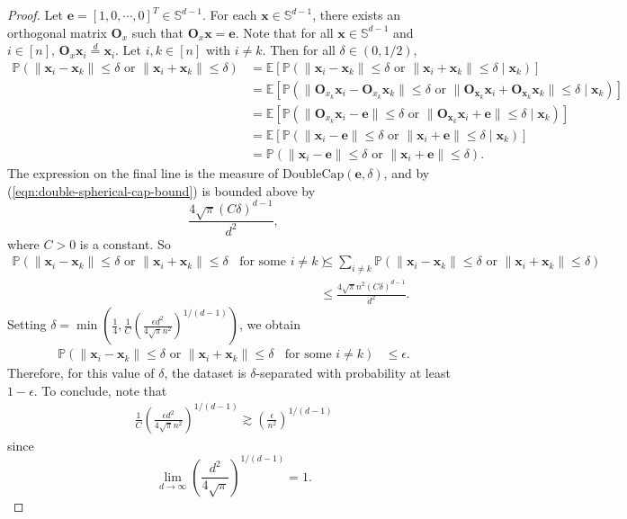 \documentclass{article}
\theoremstyle{definition}
\renewcommand{\P}{\mathbb{P}}
\newcommand{\E}{\mathbb{E}}
\renewcommand{\S}{\mathbb{S}}
\def\ve{{\bm{e}}}
\def\vx{{\bm{x}}}
\def\mO{{\bm{O}}}
\begin{document}
\begin{proof}
    Let $\ve = [1, 0, \cdots, 0]^T \in \S^{d - 1}$. For each $\vx \in \S^{d - 1}$, there exists an orthogonal matrix $\mO_x$ such that $\mO_x \vx = \ve$. Note that for all $\vx \in \S^{d - 1}$ and $i \in [n]$, $\mO_x \vx_i \stackrel{d}{=} \vx_i$. Let $i, k \in [n]$ with $i \neq k$. Then for all $\delta \in (0, 1/2)$,
    \begin{align*}
        \P(\|\vx_i - \vx_k\| \leq \delta \text{ or } \|\vx_i + \vx_k\| \leq \delta) &= \E[\P(\|\vx_i - \vx_k\| \leq \delta \text { or } \|\vx_i + \vx_k\| \leq \delta \mid \vx_k) ]\\
        &= \E[\P(\|\mO_{x_k}\vx_i - \mO_{x_k}\vx_k\| \leq \delta \text { or } \|\mO_{\vx_k}\vx_i + \mO_{\vx_k} \vx_k\| \leq \delta \mid \vx_k) ]\\
        &= \E[\P(\|\mO_{x_k}\vx_i - \ve\| \leq \delta \text{ or } \|\mO_{\vx_k}\vx_i + \ve\| \leq \delta \mid \vx_k) ]\\
        &= \E[\P(\|\vx_i - \ve\| \leq \delta \text{ or } \|\vx_i + \ve\| \leq \delta \mid \vx_k) ]\\
        &= \P(\|\vx_i - \ve\| \leq \delta \text{ or } \|\vx_i + \ve\| \leq \delta).
    \end{align*}
    The expression on the final line is the measure of $\text{DoubleCap}(\ve, \delta)$, and by (\ref{eqn:double-spherical-cap-bound}) is bounded above by
    \[\frac{4\sqrt{\pi}(C\delta)^{d - 1} }{d^2},\]
    where $C > 0$ is a constant.
    So
    \begin{align*}
        \P(\|\vx_i - \vx_k\| \leq \delta \text{ or } \|\vx_i + \vx_k\| \leq \delta \;\; \text{ for some } i \neq k) &\leq \sum_{i \neq k}\P(\|\vx_i - \vx_k\| \leq \delta \text{ or } \|\vx_i + \vx_k\| \leq \delta)\\
        &\leq \frac{4\sqrt{\pi}n^2(C\delta)^{d - 1} }{d^2}.
    \end{align*}
    Setting $\delta = \min\left(\frac{1}{4}, \frac{1}{C}\left(\frac{\epsilon d^2}{4\sqrt{\pi}n^2} \right)^{1/(d - 1)}\right)$, we obtain
    \begin{align*}
        \P(\|\vx_i - \vx_k\| \leq \delta \text{ or } \|\vx_i + \vx_k\| \leq \delta \;\; \text{ for some } i \neq k) &\leq \epsilon.
    \end{align*}
    Therefore, for this value of $\delta$, the dataset is $\delta$-separated with probability at least $1 - \epsilon$. To conclude, note that
    \begin{align*}
        \frac{1}{C}\left(\frac{\epsilon d^2}{4\sqrt{\pi}n^2} \right)^{1/(d - 1)} \gtrsim \left(\frac{\epsilon}{n^2}\right)^{1/(d - 1)}
    \end{align*}
    since
    \[\lim_{d \to \infty} \left(\frac{d^2}{4\sqrt{\pi}}\right)^{1/(d - 1)} = 1. \]
\end{proof}
\end{document}
